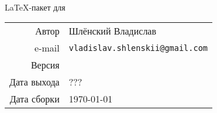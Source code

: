 \thispagestyle{empty}

\vspace*{7cm}
\begin{center}
    { \huge {} } \\[1cm]
    {
    \Large \LaTeX-пакет для
    }
\end{center}


\vspace*{7cm}
\begin{flushright}
    \begin{tabular}{@{}r@{\hskip .75cm}l@{}}
        Автор       & Шлёнский Владислав                     \\
        e-mail      & \texttt{vladislav.shlenskii@gmail.com} \\
        Версия      & \rsVersion{}                           \\
        Дата выхода & ???                                    \\
        Дата сборки & \today                                 \\
    \end{tabular}
\end{flushright}